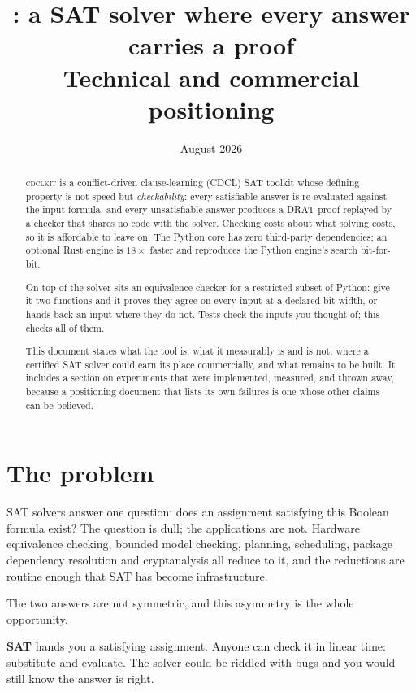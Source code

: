 \documentclass[11pt,a4paper]{article}
\title{\cdclkit: a SAT solver where every answer carries a proof\\[4pt]
       \large Technical and commercial positioning}
\author{}
\date{August 2026}
\newcommand{\cdclkit}{\textsc{cdclkit}}
\begin{document}
\maketitle
\vspace{-2.2em}

\begin{abstract}
\noindent
\cdclkit{} is a conflict-driven clause-learning (CDCL) SAT toolkit whose defining
property is not speed but \emph{checkability}: every satisfiable answer is
re-evaluated against the input formula, and every unsatisfiable answer produces
a DRAT proof replayed by a checker that shares no code with the solver.
Checking costs about what solving costs, so it is affordable to leave on. The
Python core has zero third-party dependencies; an optional Rust engine is
$18\times$ faster and reproduces the Python engine's search bit-for-bit.

On top of the solver sits an equivalence checker for a restricted subset of
Python: give it two functions and it proves they agree on every input at a
declared bit width, or hands back an input where they do not. Tests check the
inputs you thought of; this checks all of them.

This document states what the tool is, what it measurably is and is not, where
a certified SAT solver could earn its place commercially, and what remains to
be built. It includes a section on experiments that were implemented, measured,
and thrown away, because a positioning document that lists its own failures is
one whose other claims can be believed.
\end{abstract}

\section{The problem}

SAT solvers answer one question: does an assignment satisfying this Boolean
formula exist? The question is dull; the applications are not. Hardware
equivalence checking, bounded model checking, planning, scheduling, package
dependency resolution and cryptanalysis all reduce to it, and the reductions are
routine enough that SAT has become infrastructure.

The two answers are not symmetric, and this asymmetry is the whole opportunity.

\textbf{SAT} hands you a satisfying assignment. Anyone can check it in linear
time: substitute and evaluate. The solver could be riddled with bugs and you
would still know the answer is right.
\end{document}
